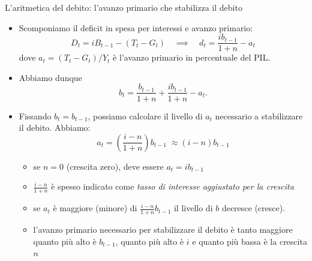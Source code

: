 \documentclass[aspectratio=149,11pt,italian]{beamer}
\begin{document}
\begin{frame}{L'aritmetica del debito: l'avanzo primario che stabilizza il debito}
\begin{itemize}
\item Scomponiamo il deficit in spesa per interessi e \alert{avanzo primario}:
\begin{equation*}
 D_{t}=iB_{t-1}-(T_{t}-G_{t}) 
\quad\implies\quad 
d_{t}=\frac{ib_{t-1}}{1+n}-a_{t}
\end{equation*}
dove $a_{t}=(T_{t}-G_{t})/Y_{t}$ è l'avanzo primario in percentuale del PIL.
\item Abbiamo dunque
\begin{equation*}
   b_{t} = \frac{b_{t-1}}{1+n} + \frac{ib_{t-1}}{1+n} - a_{t}.
\end{equation*}
\item Fissando $b_{t}=b_{t-1}$, possiamo calcolare \alert{il livello di $a_{t}$
necessario a stabilizzare il debito}. Abbiamo:
\begin{equation*}
   a_{t} = \left(\frac{i-n}{1+n}\right)b_{t-1} \; \approx (i-n)b_{t-1}
\end{equation*}
\begin{itemize}
\item se $n=0$ (crescita zero), deve essere $a_{t}=ib_{t-1}$
\item $\frac{i-n}{1+n}$ è spesso indicato come \emph{tasso di interesse aggiustato per
la crescita}
\item se $a_t$ è maggiore (minore) di $\frac{i-n}{1+n}b_{t-1}$ il livello di $b$
decresce (cresce).
\item l'avanzo primario necessario per stabilizzare il debito è tanto maggiore
quanto più alto è $b_{t-1}$, quanto più alto è $i$ e quanto più bassa è la
crescita $n$
\end{itemize}
\end{itemize}
\end{frame}
\end{document}
